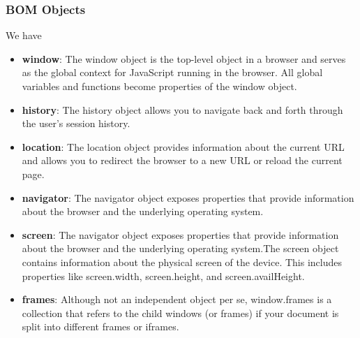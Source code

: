 \documentclass{report}
\begin{document}
    \subsubsection{BOM Objects}
    \bigbreak \noindent 
    We have
    \begin{itemize}
        \item \textbf{window}: The window object is the top-level object in a browser and serves as the global context for JavaScript running in the browser. All global variables and functions become properties of the window object.
        \item \textbf{history}: The history object allows you to navigate back and forth through the user's session history.
        \item \textbf{location}: The location object provides information about the current URL and allows you to redirect the browser to a new URL or reload the current page.
        \item \textbf{navigator}: The navigator object exposes properties that provide information about the browser and the underlying operating system.
        \item \textbf{screen}: The navigator object exposes properties that provide information about the browser and the underlying operating system.The screen object contains information about the physical screen of the device. This includes properties like screen.width, screen.height, and screen.availHeight.
        \item \textbf{frames}: Although not an independent object per se, window.frames is a collection that refers to the child windows (or frames) if your document is split into different frames or iframes.
    \end{itemize}

    \bigbreak \noindent 
\end{document}

